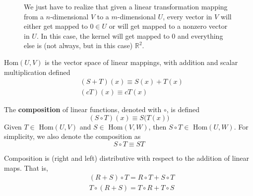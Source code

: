 \begin{theorem}
\begin{figure}[H]
      \caption{We just have to realize that given a linear transformation mapping from a $n$-dimensional $V$ to a $m$-dimensional $U$, every vector in $V$ will either get mapped to $0 \in U$ or will get mapped to a nonzero vector in $U$. In this case, the kernel will get mapped to $0$ and everything else is (not always, but in this case) $\mathbb{R}^2$. } 
      \label{fig:rank_nullity}
    \end{figure}
  \end{theorem}

  \begin{proposition}
    Hom$(U, V)$ is the vector space of linear mappings, with addition and scalar multiplication defined
    \begin{align*}
      & (S + T) (x) \equiv S(x) + T(x) \\
      & (c T) (x) \equiv c T(x)
    \end{align*}
  \end{proposition}

  \begin{definition}[Composition]
    The \textbf{composition} of linear functions, denoted with $\circ$, is defined
    \begin{equation}
      (S \circ T) (x) \equiv S\big( T(x)\big)
    \end{equation}
    Given $T \in $ Hom$(U, V)$ and $S \in $ Hom$(V, W)$, then $S \circ T \in $ Hom$(U, W)$. For simplicity, we also denote the composition as 
    \begin{equation}
      S \circ T \equiv S T
    \end{equation}
  \end{definition}

  \begin{proposition}
    Composition is (right and left) distributive with respect to the addition of linear maps. That is, 
    \begin{align*}
      & (R + S) \circ T = R \circ T + S \circ T \\
      & T \circ (R + S) = T \circ R + T \circ S 
    \end{align*}
  \end{proposition}


